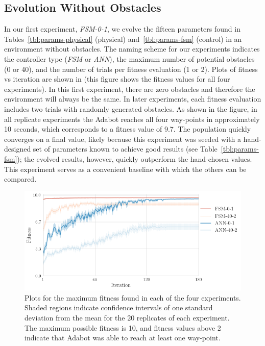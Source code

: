 \subsection{Evolution Without Obstacles}

In our first experiment, \emph{FSM-0-1}, we evolve the fifteen parameters found in Tables~\ref{tbl:params-physical} (physical) and~\ref{tbl:params-fsm} (control) in an environment without obstacles.
%
The naming scheme for our experiments indicates the controller type (\emph{FSM} or \emph{ANN}), the maximum number of potential obstacles (0 or 40), and the number of trials per fitness evaluation (1 or 2).
%
Plots of fitness vs iteration are shown in  (this figure shows the fitness values for all four experiments).
%
In this first experiment, there are zero obstacles and therefore the environment will always be the same. In later experiments, each fitness evaluation includes two trials with randomly generated obstacles.
%
As shown in the figure, in all replicate experiments the Adabot reaches all four way-points in approximately 10 seconds, which corresponds to a fitness value of 9.7.
%
The population quickly converges on a final value, likely because this experiment was seeded with a hand-designed set of parameters known to achieve good results (see Table~\ref{tbl:params-fsm}); the evolved results, however, quickly outperform the hand-chosen values.
%
This experiment serves as a convenient baseline with which the others can be compared.

\begin{figure}[!ht]
    \centering

    \includegraphics[width=\columnwidth]{figures/4-results/fitness.png}


    \caption{Plots for the maximum fitness found in each of the four experiments. Shaded regions indicate confidence intervals of one standard deviation from the mean for the 20 replicates of each experiment. The maximum possible fitness is 10, and fitness values above 2 indicate that Adabot was able to reach at least one way-point.}
    \label{fig:fitness-vs-iteration}

\end{figure}


